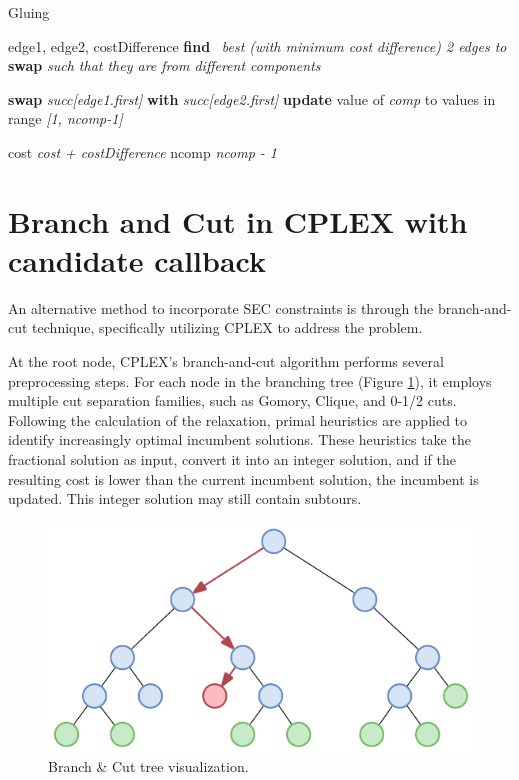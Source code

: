 \begin{algorithm}[H]
    \caption{Gluing}
    \label{alg:gluing}
    \begin{spacing}{1.3} %
        \BlankLine
        {
            edge1, edge2, costDifference \leftarrow \textbf{find} \ \textit{best (with minimum cost difference) 2 edges to} \textbf{swap} \textit{such that they are from different components}\;
            
            \BlankLine
            \textbf{swap} \textit{succ[edge1.first]} \textbf{with} \textit{succ[edge2.first]}\;
            \textbf{update} value of \textit{comp} to values in range \textit{[1, ncomp-1]}\;

            \BlankLine
            cost \leftarrow \textit{cost + costDifference}\;
            ncomp \leftarrow \textit{ncomp - 1}\;
        }
        \BlankLine
    \end{spacing}
\end{algorithm}

\section{Branch and Cut in CPLEX with candidate callback}

An alternative method to incorporate SEC constraints is through the branch-and-cut technique, specifically utilizing CPLEX to address the problem. 

At the root node, CPLEX’s branch-and-cut algorithm performs several preprocessing steps. For each node in the branching tree (Figure \ref{fig:bec_img}), it employs multiple cut separation families, such as Gomory, Clique, and 0-1/2 cuts. Following the calculation of the relaxation, primal heuristics are applied to identify increasingly optimal incumbent solutions. These heuristics take the fractional solution as input, convert it into an integer solution, and if the resulting cost is lower than the current incumbent solution, the incumbent is updated. This integer solution may still contain subtours. 


\begin{figure}[H]
    \centering
    \includegraphics[width=0.9\linewidth]{Immagini/bec.pdf}
    \caption{Branch \& Cut tree visualization.}
    \label{fig:bec_img}
\end{figure}

